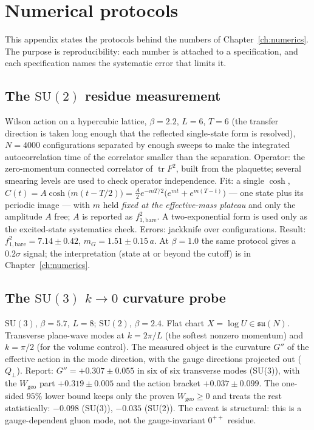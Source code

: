 \section{Numerical protocols}
\label{app:protocols}

This appendix states the protocols behind the numbers of Chapter~\ref{ch:numerics}. The purpose is
reproducibility: each number is attached to a specification, and each specification names the
systematic error that limits it.

\subsection{The $\mathrm{SU}(2)$ residue measurement}

Wilson action on a hypercubic lattice, $\beta=2.2$, $L=6$, $T=6$ (the transfer direction is
taken long enough that the reflected single-state form is resolved), $N=4000$ configurations
separated by enough sweeps to make the integrated autocorrelation time of the correlator smaller
than the separation. Operator: the zero-momentum connected correlator of
$\operatorname{tr}F^2$, built from the plaquette; several smearing levels are used to check
operator independence. Fit: a single $\cosh$,
$C(t)=A\cosh\bigl(m(t-T/2)\bigr)=\tfrac{A}{2}e^{-mT/2}\bigl(e^{mt}+e^{m(T-t)}\bigr)$ --- one
state plus its periodic image --- with $m$ held \emph{fixed at the effective-mass plateau} and only
the amplitude $A$ free; $A$ is reported as $f_{1,\mathrm{bare}}^2$. A two-exponential form is used
only as the excited-state systematics check. Errors: jackknife over configurations. Result:
$f_{1,\mathrm{bare}}^2=7.14\pm0.42$,
$m_G=1.51\pm0.15\,a$. At $\beta=1.0$ the same protocol gives a $0.2\sigma$ signal; the
interpretation (state at or beyond the cutoff) is in Chapter~\ref{ch:numerics}.

\subsection{The $\mathrm{SU}(3)$ $k\to0$ curvature probe}

$\mathrm{SU}(3)$, $\beta=5.7$, $L=8$; $\mathrm{SU}(2)$, $\beta=2.4$. Flat chart
$X=\log U\in\mathfrak{su}(N)$. Transverse plane-wave modes at $k=2\pi/L$ (the softest nonzero
momentum) and $k=\pi/2$ (for the volume control). The measured object is the curvature $G''$ of
the effective action in the mode direction, with the gauge directions projected out
($Q_\perp$). Report: $G''=+0.307\pm0.055$ in six of six transverse modes (SU(3)), with the
$W_{\mathrm{geo}}$ part $+0.319\pm0.005$ and the action bracket $+0.037\pm0.099$. The
one-sided $95\%$ lower bound keeps only the proven $W_{\mathrm{geo}}\ge0$ and treats the rest
statistically: $-0.098$ (SU(3)), $-0.035$ (SU(2)). The caveat is structural: this is a
gauge-dependent gluon mode, not the gauge-invariant $0^{++}$ residue.

